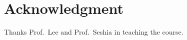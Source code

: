 \documentclass[conference, 11pt]{IEEEtran}
\begin{document}

\section*{Acknowledgment}
Thanks Prof.\, Lee and Prof.\, Seshia in teaching the course.



%
%
%

\end{document}
